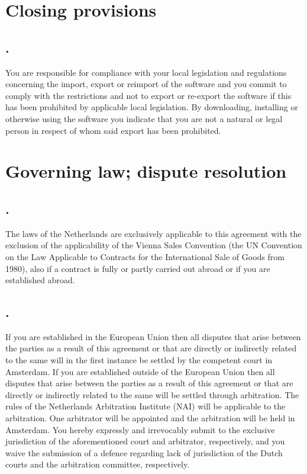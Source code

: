 \documentclass[letterpaper,10pt,english]{sphinxmanual}
\begin{document}
\chapter{Closing provisions}
\label{Provisions::doc}\label{Provisions:closing-provisions}

\section{.}
\label{Provisions:id1}
You are responsible for compliance with your local legislation and regulations concerning the import, export or reimport of the software and you commit to comply with the restrictions and not to export or re-export the software if this has been prohibited by applicable local legislation. By downloading, installing or otherwise using the software you indicate that you are not a natural or legal person in respect of whom said export has been prohibited.


\chapter{Governing law; dispute resolution}
\label{Law::doc}\label{Law:governing-law-dispute-resolution}

\section{.}
\label{Law:id1}
The laws of the Netherlands are exclusively applicable to this agreement with the exclusion of the applicability of the Vienna Sales Convention (the UN Convention on the Law Applicable to Contracts for the International Sale of Goods from 1980), also if a contract is fully or partly carried out abroad or if you are established abroad.


\section{.}
\label{Law:id2}
If you are established in the European Union then all disputes that arise between the parties as a result of this agreement or that are directly or indirectly related to the same will in the first instance be settled by the competent court in Amsterdam. If you are established outside of the European Union then all disputes that arise between the parties as a result of this agreement or that are directly or indirectly related to the same will be settled through arbitration. The rules of the Netherlands Arbitration Institute (NAI) will be applicable to the arbitration. One arbitrator will be appointed and the arbitration will be held in Amsterdam. You hereby expressly and irrevocably submit to the exclusive jurisdiction of the aforementioned court and arbitrator, respectively, and you waive the submission of a defence regarding lack of jurisdiction of the Dutch courts and the arbitration committee, respectively.
\end{document}
